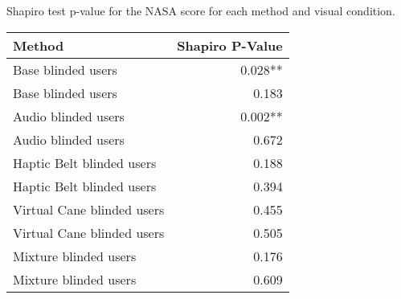 
\centering
\caption{Shapiro test p-value for the NASA score for each method and visual condition.}
\label{tab:shapiro_nasa_score}
\begin{tabular}{lr}
\toprule
                    Method & Shapiro P-Value \\
\midrule
        Base blinded users &         0.028** \\
        Base blinded users &           0.183 \\
       Audio blinded users &         0.002** \\
       Audio blinded users &           0.672 \\
 Haptic Belt blinded users &           0.188 \\
 Haptic Belt blinded users &           0.394 \\
Virtual Cane blinded users &           0.455 \\
Virtual Cane blinded users &           0.505 \\
     Mixture blinded users &           0.176 \\
     Mixture blinded users &           0.609 \\
\bottomrule
\end{tabular}
